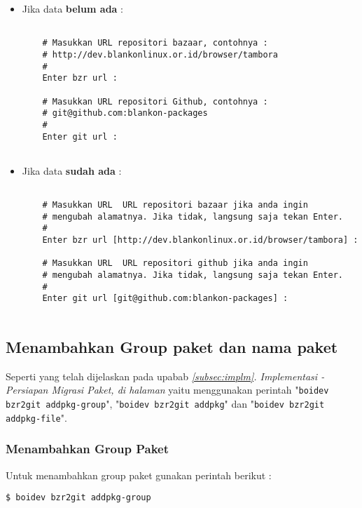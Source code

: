{\begin{itemize}
	\item Jika data \textbf{belum ada} :
	
	\begin{lstlisting}[language=ShellBash2]
	
	# Masukkan URL repositori bazaar, contohnya :
	# http://dev.blankonlinux.or.id/browser/tambora
	#
	Enter bzr url : 
	
	# Masukkan URL repositori Github, contohnya :
	# git@github.com:blankon-packages
	#
	Enter git url : 
	
	\end{lstlisting}
	
	\item Jika data \textbf{sudah ada} :
	
	\begin{lstlisting}[language=ShellBash2]
	
	# Masukkan URL  URL repositori bazaar jika anda ingin 
	# mengubah alamatnya. Jika tidak, langsung saja tekan Enter.
	#
	Enter bzr url [http://dev.blankonlinux.or.id/browser/tambora] : 
	
	# Masukkan URL  URL repositori github jika anda ingin 
	# mengubah alamatnya. Jika tidak, langsung saja tekan Enter.
	#
	Enter git url [git@github.com:blankon-packages] : 
	
	\end{lstlisting}
	
\end{itemize}

\subsection{Menambahkan Group paket dan nama paket}
\label{implm_3}
\noindent
Seperti yang telah dijelaskan pada upabab \textit{\ref{subsec:implm}. Implementasi - \textit{Persiapan Migrasi Paket}, di halaman \pageref{itm:pre_step3}} yaitu menggunakan perintah "\texttt{boidev bzr2git addpkg-group}", "\texttt{boidev bzr2git addpkg}" dan "\texttt{boidev bzr2git addpkg-file}".

\subsubsection{Menambahkan Group Paket}
\label{subsubsec:addpkg-group}
\noindent
Untuk menambahkan group paket gunakan perintah berikut :

\begin{lstlisting}[language=ShellBash]
$ boidev bzr2git addpkg-group 
\end{lstlisting}

}
